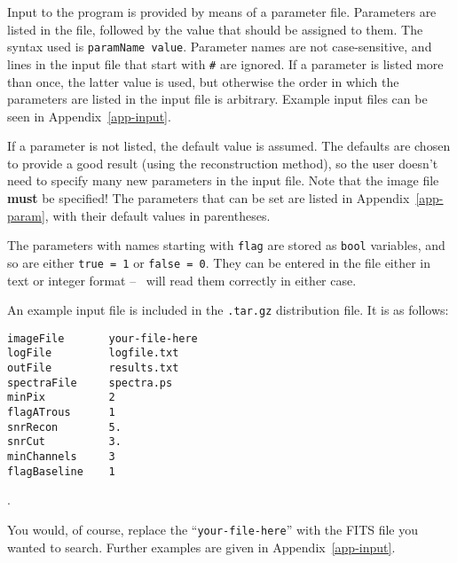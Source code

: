 \label{sec-param}

Input to the program is provided by means of a parameter
file. Parameters are listed in the file, followed by the value that
should be assigned to them. The syntax used is \texttt{paramName
value}. Parameter names are not case-sensitive, and lines in the input
file that start with \texttt{\#} are ignored. If a parameter is listed
more than once, the latter value is used, but otherwise the order in
which the parameters are listed in the input file is
arbitrary. Example input files can be seen in
Appendix~\ref{app-input}.

If a parameter is not listed, the default value is assumed. The
defaults are chosen to provide a good result (using the reconstruction
method), so the user doesn't need to specify many new parameters in
the input file. Note that the image file \textbf{must} be specified!
The parameters that can be set are listed in Appendix~\ref{app-param},
with their default values in parentheses.

The parameters with names starting with \texttt{flag} are stored as
\texttt{bool} variables, and so are either \texttt{true = 1} or
\texttt{false = 0}. They can be entered in the file either in text or
integer format -- \duchamp\ will read them correctly in either case.

An example input file is included in the \texttt{.tar.gz} distribution
file. It is as follows:

\begin{verbatim}
imageFile       your-file-here
logFile         logfile.txt
outFile         results.txt
spectraFile     spectra.ps
minPix          2
flagATrous      1
snrRecon        5.
snrCut          3.
minChannels     3
flagBaseline    1
\end{verbatim}.

You would, of course, replace the ``\texttt{your-file-here}'' with the
FITS file you wanted to search. Further examples are given in
Appendix~\ref{app-input}.
